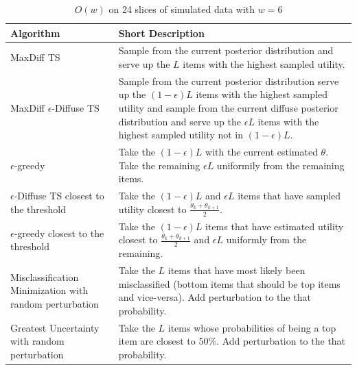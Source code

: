 \documentclass[nonblindrev]{informs3}
\begin{document}
\begin{table}[ht]
\caption{$O(w)$ on 24 slices of simulated data with $w=6$}
\begin{tabular}{p{5cm}|p{11cm}}
Algorithm & Short Description \\
\hline
MaxDiff TS & Sample from the current posterior distribution and serve up the $L$ items with the highest sampled utility.\\
MaxDiff $\epsilon$-Diffuse TS & Sample from the current posterior distribution serve up the $(1-\epsilon)L$ items with the highest sampled utility and sample from the current diffuse posterior distribution and serve up the $\epsilon L$ items with the highest sampled utility not in $(1-\epsilon)L$.\\
$\epsilon$-greedy & Take the $(1-\epsilon)L$ with the current estimated $\theta$. Take the remaining $\epsilon L$ uniformily from the remaining items.\\
$\epsilon$-Diffuse TS closest to the threshold & Take the $(1-\epsilon)L$ and  $\epsilon L$ items that have sampled utility closest to $\frac{\theta_k+\theta_{k+1}}{2}$.\\
$\epsilon$-greedy closest to the threshold & Take the $(1-\epsilon)L$ items that have estimated utility closest to $\frac{\theta_k+\theta_{k+1}}{2}$ and $\epsilon L$ uniformly from the remaining.\\
Misclassification Minimization with random perturbation& Take the $L$ items that have most likely been misclassified (bottom items that should be top items and vice-versa). Add perturbation to the that probability.\\
Greatest Uncertainty with random perturbation& Take the $L$ items whose probabilities of being a top item are closest to 50\%. Add perturbation to the that probability.\\

\end{tabular}
\end{table}
\end{document}
